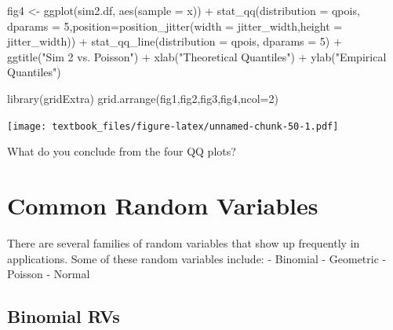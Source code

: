 \documentclass[
  11pt,
]{book}
\newenvironment{Shaded}{\begin{snugshade}}{\end{snugshade}}
\newcommand{\AttributeTok}[1]{\textcolor[rgb]{0.77,0.63,0.00}{#1}}
\newcommand{\DecValTok}[1]{\textcolor[rgb]{0.00,0.00,0.81}{#1}}
\newcommand{\FunctionTok}[1]{\textcolor[rgb]{0.00,0.00,0.00}{#1}}
\newcommand{\NormalTok}[1]{#1}
\newcommand{\OtherTok}[1]{\textcolor[rgb]{0.56,0.35,0.01}{#1}}
\newcommand{\SpecialCharTok}[1]{\textcolor[rgb]{0.00,0.00,0.00}{#1}}
\newcommand{\StringTok}[1]{\textcolor[rgb]{0.31,0.60,0.02}{#1}}
\theoremstyle{definition}
\theoremstyle{definition}
\theoremstyle{definition}
\theoremstyle{definition}
\theoremstyle{remark}
\begin{document}
\begin{Shaded}
\begin{Highlighting}[]
\NormalTok{fig4 }\OtherTok{\textless{}{-}} \FunctionTok{ggplot}\NormalTok{(sim2.df, }\FunctionTok{aes}\NormalTok{(}\AttributeTok{sample =}\NormalTok{ x)) }\SpecialCharTok{+}
  \FunctionTok{stat\_qq}\NormalTok{(}\AttributeTok{distribution =}\NormalTok{ qpois, }\AttributeTok{dparams =} \DecValTok{5}\NormalTok{,}\AttributeTok{position=}\FunctionTok{position\_jitter}\NormalTok{(}\AttributeTok{width =}\NormalTok{ jitter\_width,}\AttributeTok{height =}\NormalTok{ jitter\_width)) }\SpecialCharTok{+}
  \FunctionTok{stat\_qq\_line}\NormalTok{(}\AttributeTok{distribution =}\NormalTok{ qpois, }\AttributeTok{dparams =} \DecValTok{5}\NormalTok{) }\SpecialCharTok{+}
  \FunctionTok{ggtitle}\NormalTok{(}\StringTok{"Sim 2 vs. Poisson"}\NormalTok{) }\SpecialCharTok{+}
  \FunctionTok{xlab}\NormalTok{(}\StringTok{"Theoretical Quantiles"}\NormalTok{) }\SpecialCharTok{+}
  \FunctionTok{ylab}\NormalTok{(}\StringTok{"Empirical Quantiles"}\NormalTok{)}
\end{Highlighting}
\end{Shaded}

\newpage

\begin{Shaded}
\begin{Highlighting}[]
\FunctionTok{library}\NormalTok{(gridExtra)}
\FunctionTok{grid.arrange}\NormalTok{(fig1,fig2,fig3,fig4,}\AttributeTok{ncol=}\DecValTok{2}\NormalTok{)}
\end{Highlighting}
\end{Shaded}

\texttt{[image: textbook\_files/figure-latex/unnamed-chunk-50-1.pdf]}

What do you conclude from the four QQ plots?

\newpage

\hypertarget{common-random-variables}{%
\section{Common Random Variables}\label{common-random-variables}}

There are several families of random variables that show up frequently in applications. Some of these random variables include:
- Binomial
- Geometric
- Poisson
- Normal

\hypertarget{binomial-rvs}{%
\subsection{Binomial RVs}\label{binomial-rvs}}
\end{document}
